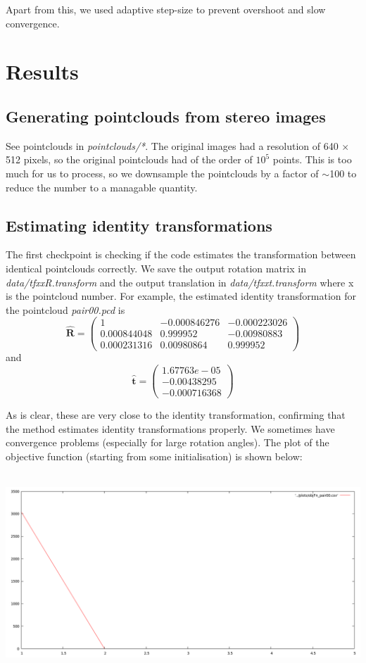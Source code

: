 \documentclass[11pt, a4paper]{article}
\begin{document}
\noindent Apart from this, we used adaptive step-size to prevent overshoot and slow convergence.

\section{Results}
\subsection{Generating pointclouds from stereo images}
See pointclouds in \textit{pointclouds/*}. The original images had a resolution of 640 $\times$ 512 pixels, so the original pointclouds had of the order of $10^5$ points. This is too much for us to process, so we downsample the pointclouds by a factor of $\sim$100 to reduce the number to a managable quantity.

\subsection{Estimating identity transformations}
The first checkpoint is checking if the code estimates the transformation between identical pointclouds correctly. We save the output rotation matrix in \textit{data/tfxxR.transform} and the output translation in \textit{data/tfxxt.transform} where x is the pointcloud number. For example, the estimated identity transformation for the pointcloud \textit{pair00.pcd} is $$\hat{\textbf{R}} = \begin{pmatrix}
  1 & -0.000846276 & -0.000223026 \\
  0.000844048 & 0.999952 & -0.00980883 \\
  0.000231316 & 0.00980864 & 0.999952
 \end{pmatrix}$$ and $$\hat{\textbf{t}} = \begin{pmatrix}
 1.67763e-05 \\
 -0.00438295 \\
 -0.000716368
 \end{pmatrix}$$

\noindent As is clear, these are very close to the identity transformation, confirming that the method estimates identity transformations properly. We sometimes have convergence problems (especially for large rotation angles). The plot of the objective function (starting from some initialisation) is shown below: \\ \\
\centerline{\includegraphics[scale=0.35]{objFn_pair00}}
\end{document}
